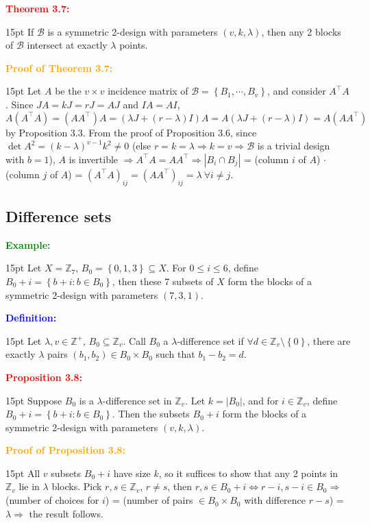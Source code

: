 \documentclass[12pt]{article}
\newcommand{\noparskip}{\vspace{-\parskip}}
\newenvironment{dent}
	{\begin{adjustwidth}{15pt}{}\noparskip}
	{\end{adjustwidth}}
\newenvironment{result}[1]
	{\textcolor{Red}{\textbf{#1:}}\begin{dent}}
	{\end{dent}}
\newenvironment{proof}[1]
	{\textcolor{Orange}{\textbf{Proof of #1:}}\begin{dent}}
	{\end{dent}}
\newenvironment{definition}
	{\textcolor{Blue}{\textbf{Definition:}}\begin{dent}}
	{\end{dent}}
\newenvironment{example}
	{\textcolor{Green}{\textbf{Example:}}\begin{dent}}
	{\end{dent}}
\renewcommand{\implies}{\Rightarrow}
\renewcommand{\iff}{\Leftrightarrow}
\newcommand{\set}[1]{\left\{ #1 \right\}}
\newcommand{\sizeof}[1]{\left| #1 \right|}
\newcommand{\Z}{\mathbb{Z}}
\newcommand{\cB}{\mathcal{B}}
\begin{document}
\begin{result}{Theorem 3.7}
If $\cB$ is a symmetric 2-design with parameters $(v, k, \lambda)$, then any 2 blocks of $\cB$ intersect at exactly $\lambda$ points.
\end{result}

\begin{proof}{Theorem 3.7}
Let $A$ be the $v \times v$ incidence matrix of $\cB = \set{B_1, \cdots, B_v}$, and consider $A^\top A$. Since $JA = kJ = rJ = AJ$ and $IA = AI$, $A(A^\top A) = (AA^\top)A = (\lambda J + (r - \lambda) I)A = A(\lambda J + (r - \lambda) I) = A(AA^\top)$ by Proposition 3.3. From the proof of Proposition 3.6, since $\det{A}^2 = (k - \lambda)^{v - 1} k^2 \ne 0$ (else $r = k = \lambda \implies k = v \implies \cB$ is a trivial design with $b = 1$), $A$ is invertible $\implies A^\top A = AA^\top \implies \sizeof{B_i \cap B_j}$ = (column $i$ of $A$) $\cdot$ (column $j$ of $A$) = $(A^\top A)_{ij} = (AA^\top)_{ij} = \lambda\ \forall i \ne j$.
\end{proof}

\subsection{Difference sets}

\begin{example}
Let $X = \Z_7$, $B_0 = \set{0, 1, 3} \subseteq X$. For $0 \le i \le 6$, define $B_0 + i = \set{b + i: b \in B_0}$, then these 7 subsets of $X$ form the blocks of a symmetric 2-design with parameters $(7, 3, 1)$.
\end{example}

\begin{definition}
Let $\lambda, v \in \Z^+$, $B_0 \subseteq \Z_v$. Call $B_0$ a $\lambda$-difference set if $\forall d \in \Z_v \setminus \set{0}$, there are exactly $\lambda$ pairs $(b_1, b_2) \in B_0 \times B_0$ such that $b_1 - b_2 = d$.
\end{definition}

\begin{result}{Proposition 3.8}
Suppose $B_0$ is a $\lambda$-difference set in $\Z_v$. Let $k = \sizeof{B_0}$, and for $i \in \Z_v$, define $B_0 + i = \set{b + i: b \in B_0}$. Then the subsets $B_0 + i$ form the blocks of a symmetric 2-design with parameters $(v, k, \lambda)$.
\end{result}

\begin{proof}{Proposition 3.8}
All $v$ subsets $B_0 + i$ have size $k$, so it suffices to show that any 2 points in $\Z_v$ lie in $\lambda$ blocks. Pick $r, s \in \Z_v$, $r \ne s$, then $r, s \in B_0 + i \iff r - i, s - i \in B_0 \implies$ (number of choices for $i$) = (number of pairs $\in B_0 \times B_0$ with difference $r - s$) = $\lambda \implies$ the result follows.
\end{proof}
\end{document}
